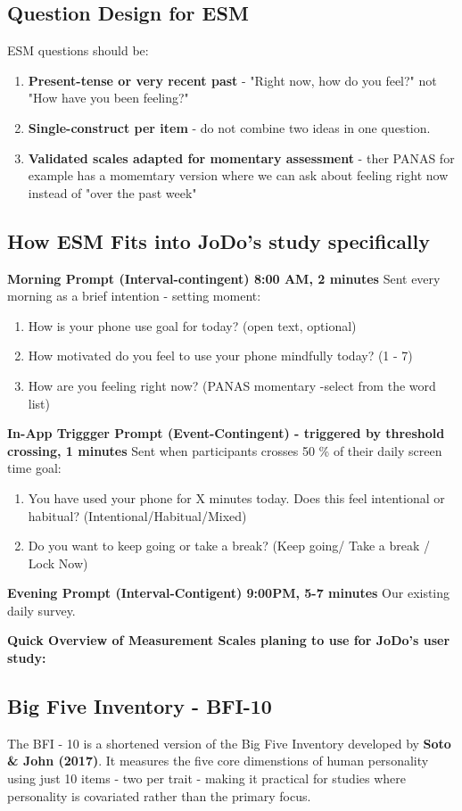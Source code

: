 \documentclass[12pt]{article}
\begin{document}
\subsection{Question Design for ESM}
ESM questions should be:
\begin{enumerate}
    \item \textbf{Present-tense or very recent past} - "Right now, how do you feel?" not "How have you been feeling?"
    \item \textbf{Single-construct per item} - do not combine two ideas in one question.
    \item \textbf{Validated scales adapted for momentary assessment} - ther PANAS for example has a momemtary version where we can ask about feeling right now instead of "over the past week"
\end{enumerate}


\subsection{How ESM Fits into JoDo's study specifically}
\textbf{Morning Prompt (Interval-contingent) 8:00 AM, 2 minutes}
Sent every morning as a brief intention - setting moment:
\begin{enumerate}
    \item How is your phone use goal for today? (open text, optional)
    \item How motivated do you feel to use your phone mindfully today? (1 - 7)
    \item How are you feeling right now? (PANAS momentary -select from the word list)
\end{enumerate}


\textbf{In-App Triggger Prompt (Event-Contingent) - triggered by threshold crossing, 1 minutes}
Sent when participants crosses 50 \% of their daily screen time goal:
\begin{enumerate}
    \item You have used your phone for X minutes today. Does this feel intentional or habitual? (Intentional/Habitual/Mixed)
    \item Do you want to keep going or take a break? (Keep going/ Take a break / Lock Now)
\end{enumerate}

\textbf{Evening Prompt (Interval-Contigent) 9:00PM, 5-7 minutes}
Our existing daily survey.


\textbf{Quick Overview of Measurement Scales planing to use for JoDo's user study: }
\subsection{Big Five Inventory - BFI-10}
The BFI - 10 is a shortened version of the Big Five Inventory developed by \textbf{Soto \& John (2017)}. It measures the five core dimenstions of human personality using just 10 items - two per trait - making it practical for studies where personality is covariated rather than the primary focus.
\end{document}
